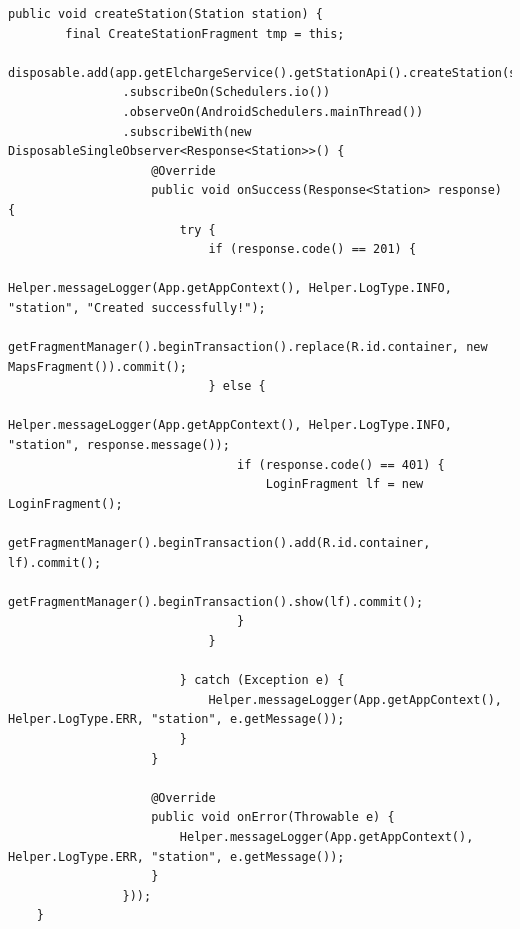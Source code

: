 \begin{lstlisting}[label=list:android_station_create_request,caption=Tworzenie stacji: wysłanie zapytania i obsługa odpowiedzi,basicstyle=\tiny\ttfamily]
    public void createStation(Station station) {
        final CreateStationFragment tmp = this;
        disposable.add(app.getElchargeService().getStationApi().createStation(station)
                .subscribeOn(Schedulers.io())
                .observeOn(AndroidSchedulers.mainThread())
                .subscribeWith(new DisposableSingleObserver<Response<Station>>() {
                    @Override
                    public void onSuccess(Response<Station> response) {
                        try {
                            if (response.code() == 201) {
                                Helper.messageLogger(App.getAppContext(), Helper.LogType.INFO, "station", "Created successfully!");
                                getFragmentManager().beginTransaction().replace(R.id.container, new MapsFragment()).commit();
                            } else {
                                Helper.messageLogger(App.getAppContext(), Helper.LogType.INFO, "station", response.message());
                                if (response.code() == 401) {
                                    LoginFragment lf = new LoginFragment();
                                    getFragmentManager().beginTransaction().add(R.id.container, lf).commit();
                                    getFragmentManager().beginTransaction().show(lf).commit();
                                }
                            }

                        } catch (Exception e) {
                            Helper.messageLogger(App.getAppContext(), Helper.LogType.ERR, "station", e.getMessage());
                        }
                    }

                    @Override
                    public void onError(Throwable e) {
                        Helper.messageLogger(App.getAppContext(), Helper.LogType.ERR, "station", e.getMessage());
                    }
                }));
    }
\end{lstlisting}

